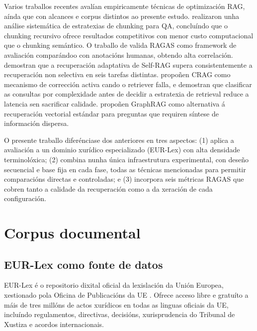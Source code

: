 \documentclass[11pt, a4paper, oneside]{report}
\begin{document}
Varios traballos recentes avalían empiricamente técnicas de optimización RAG, aínda que
con alcances e corpus distintos ao presente estudo. \citet{shi2024chunking} realizaron
unha análise sistemática de estratexias de chunking para QA, concluíndo que o
chunking recursivo ofrece resultados competitivos con menor custo computacional que o
chunking semántico. O traballo de \citeauthor{es2023ragas} valida RAGAS como framework
de avaliación comparándoo con anotacións humanas, obtendo alta correlación.
\citet{asai2024self} demostran que a recuperación adaptativa de Self-RAG supera
consistentemente a recuperación non selectiva en seis tarefas distintas.
\citet{yan2024corrective} propoñen CRAG como mecanismo de corrección activa cando o
retriever falla, e \citet{jeong2024adaptive} demostran que clasificar as consultas por
complexidade antes de decidir a estratexia de retrieval reduce a latencia sen sacrificar
calidade. \citet{edge2024local} propoñen GraphRAG como alternativa á recuperación
vectorial estándar para preguntas que requiren síntese de información dispersa.

O presente traballo diferénciase dos anteriores en tres aspectos: (1) aplica a
avaliación a un dominio xurídico especializado (EUR-Lex) con alta densidade
terminolóxica; (2) combina nunha única infraestrutura experimental, con deseño
secuencial e base fija en cada fase, todas as técnicas mencionadas para permitir
comparacións directas e controladas; e (3) incorpora seis métricas RAGAS que cobren
tanto a calidade da recuperación como a da xeración de cada configuración.

\section{Corpus documental}
\label{sec:corpus}

\subsection{EUR-Lex como fonte de datos}
\label{sec:eurlex}

EUR-Lex é o repositorio dixital oficial da lexislación da Unión Europea, xestionado
pola Oficina de Publicacións da UE \citep{eurlex2024}. Ofrece acceso libre e gratuíto
a máis de tres millóns de actos xurídicos en todas as linguas oficiais da UE, incluíndo
regulamentos, directivas, decisións, xurisprudencia do Tribunal de Xustiza e acordos
internacionais.
\end{document}

